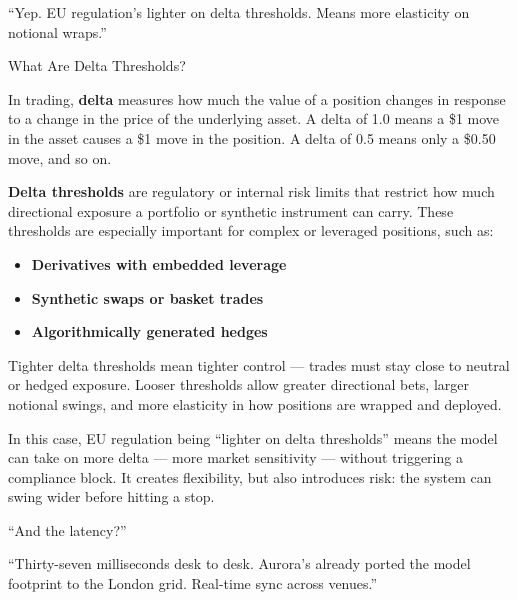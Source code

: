 “Yep. EU regulation’s lighter on delta thresholds. Means more elasticity on notional wraps.”

\medskip

\begin{TechnicalSidebar}{What Are Delta Thresholds?}

  In trading, \textbf{delta} measures how much the value of a position changes in response to a change in the price 
  of the underlying asset.  
  A delta of 1.0 means a \$1 move in the asset causes a \$1 move in the position. A delta of 0.5 means only a \$0.50 
  move, and so on.

  \medskip

  \textbf{Delta thresholds} are regulatory or internal risk limits that restrict how much directional exposure a 
  portfolio or synthetic instrument can carry.  
  These thresholds are especially important for complex or leveraged positions, such as:

  \medskip

  \begin{itemize}
    \item \textbf{Derivatives with embedded leverage}
    \item \textbf{Synthetic swaps or basket trades}
    \item \textbf{Algorithmically generated hedges}
  \end{itemize}

  \medskip

  Tighter delta thresholds mean tighter control — trades must stay close to neutral or hedged exposure.  
  Looser thresholds allow greater directional bets, larger notional swings, and more elasticity in how positions 
  are wrapped and deployed.

  \medskip

  In this case, EU regulation being “lighter on delta thresholds” means the model can take on more delta — more 
  market sensitivity —  
  without triggering a compliance block. It creates flexibility, but also introduces risk: the system can swing 
  wider before hitting a stop.

\end{TechnicalSidebar}

\medskip

“And the latency?”

“Thirty-seven milliseconds desk to desk. Aurora’s already ported the model footprint to the London grid. 
Real-time sync across venues.”


\medskip

